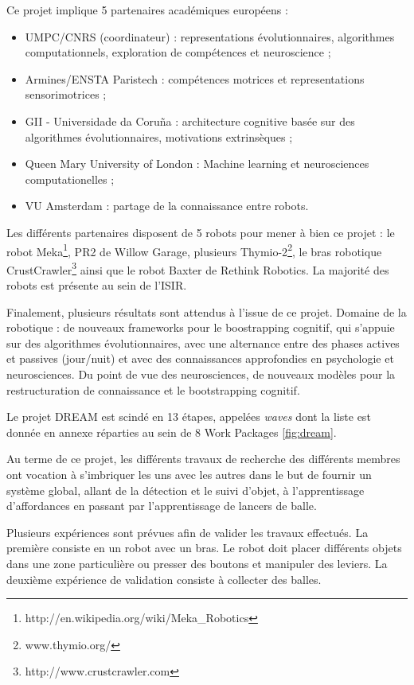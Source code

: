 \documentclass[draft]{llncs}
\begin{document}
Ce projet implique 5 partenaires académiques européens : 

\begin{itemize}
  \item UMPC/CNRS (coordinateur) : representations évolutionnaires, algorithmes computationnels, exploration de compétences et neuroscience ;
  \item Armines/ENSTA Paristech : compétences motrices et representations sensorimotrices ;
  \item GII - Universidade da Coruña :  architecture cognitive basée sur des algorithmes évolutionnaires, motivations extrinsèques ;
  \item Queen Mary University of London : Machine learning et neurosciences computationelles ;
  \item VU Amsterdam : partage de la connaissance entre robots.
\end{itemize}

Les différents partenaires disposent de 5 robots pour mener à bien ce projet : le robot Meka\footnote{http://en.wikipedia.org/wiki/Meka\_Robotics}, PR2 de Willow Garage, plusieurs Thymio-2\footnote{www.thymio.org/}, le bras robotique CrustCrawler\footnote{http://www.crustcrawler.com} ainsi que le robot Baxter de Rethink Robotics. La majorité des robots est présente au sein de l'ISIR.

Finalement, plusieurs résultats sont attendus à l'issue de ce projet.
Domaine de la robotique : de nouveaux frameworks pour le boostrapping cognitif, qui s'appuie sur des algorithmes évolutionnaires, avec une alternance entre des phases actives et passives (jour/nuit) et avec des connaissances approfondies en psychologie et neurosciences.
Du point de vue des neurosciences, de nouveaux modèles pour la restructuration de connaissance et le bootstrapping cognitif.

Le projet DREAM est scindé en 13 étapes, appelées \textit{waves} dont la liste est donnée en annexe réparties au sein de 8 Work Packages \ref{fig:dream}.

Au terme de ce projet, les différents travaux de recherche des différents membres ont vocation à s'imbriquer les uns avec les autres dans le but de fournir un système global, allant de la détection et le suivi d'objet, à l'apprentissage d'affordances en passant par l'apprentissage de lancers de balle.


Plusieurs expériences sont prévues afin de valider les travaux effectués.
La première consiste en un robot avec un bras.
Le robot doit placer différents objets dans une zone particulière ou presser des boutons et manipuler des leviers. La deuxième expérience de validation consiste à collecter des balles.
\end{document}
